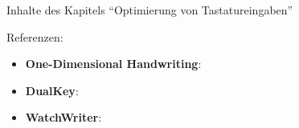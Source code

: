 Inhalte des Kapitels \enquote{Optimierung von Tastatureingaben}

\noindent Referenzen:
\begin{itemize}
\item \textbf{One-Dimensional Handwriting}: \cite{Yu.2015}
\item \textbf{DualKey}: \cite{Gupta.2015}
\item \textbf{WatchWriter}: \cite{Gordon.2015}
\end{itemize}